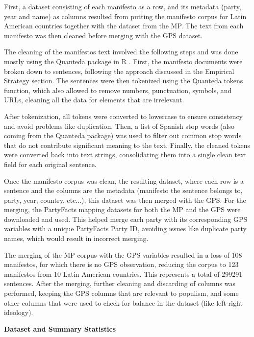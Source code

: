\documentclass[12pt,letterpaper]{article}
\begin{document}
\noindent First, a dataset consisting of each manifesto as a row, and its metadata (party, year and name) as columns resulted from putting the manifesto corpus for Latin American countries together with the dataset from the MP. The text from each manifesto was then cleaned before merging with the GPS dataset. 

The cleaning of the manifestos text involved the following steps and was done mostly using the Quanteda package in R \autocite{QuantitativeAnalysisTextual}. First, the manifesto documents were broken down to sentences, following the approach discussed in the Empirical Strategy section. The sentences were then tokenized using the Quanteda tokens function, which also allowed to remove numbers, punctuation, symbols, and URLs, cleaning all the data for elements that are irrelevant.  

After tokenization, all tokens were converted to lowercase to ensure consistency and avoid problems like duplication. Then, a list of Spanish stop words (also coming from the Quanteda package) was used to filter out common stop words that do not contribute significant meaning to the text. Finally, the cleaned tokens were converted back into text strings, consolidating them into a single clean text field for each original sentence.

Once the manifesto corpus was clean, the resulting dataset, where each row is a sentence and the columns are the metadata (manifesto the sentence belongs to, party, year, country, etc...), this dataset was then merged with the GPS. For the merging, the PartyFacts mapping datasets \autocite{PartyFactsDatabase} for both the MP and the GPS were downloaded and used. This helped merge each party with its corresponding GPS variables with a unique PartyFacts Party ID, avoiding issues like duplicate party names, which would result in incorrect merging. 

The merging of the MP corpus with the GPS variables resulted in a loss of 108 manifestos, for which there is no GPS observation, reducing the corpus to 123 manifestos from 10 Latin American countries. This represents a total of 299291 sentences. After the merging, further cleaning and discarding of columns was performed, keeping the GPS columns that are relevant to populism, and some other columns that were used to check for balance in the dataset (like left-right ideology). 

\vspace{.25cm}
\noindent \textbf{Dataset and Summary Statistics}
\vspace{.25cm}
\end{document}
